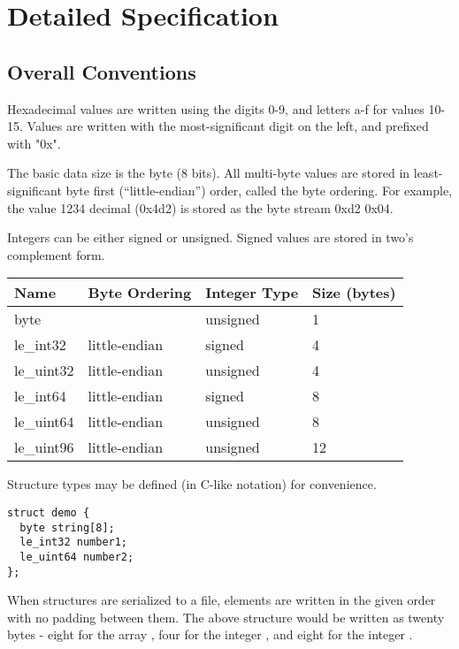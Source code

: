\section{Detailed Specification}
%
\subsection{Overall Conventions}

Hexadecimal values are written using the digits 0-9, and letters a-f
for values 10-15.
%
Values are written with the most-significant digit on the left, and
prefixed with "0x".

The basic data size is the byte (8 bits).
%
All multi-byte values are stored in least-significant byte first
(``little-endian'') order, called the byte ordering.
%
For example, the value 1234 decimal (0x4d2) is stored as the byte
stream 0xd2 0x04.

Integers can be either signed or unsigned.
%
Signed values are stored in two's complement form.

\begin{center}
\begin{tabular}{l l l l}
\hline
\textbf{Name} & \textbf{Byte Ordering} & \textbf{Integer Type} & \textbf{Size (bytes)} \\
\hline
byte & & unsigned & 1 \\
le\_int32 & little-endian & signed & 4 \\
le\_uint32 & little-endian & unsigned & 4 \\
le\_int64 & little-endian & signed & 8 \\
le\_uint64 & little-endian & unsigned & 8 \\
le\_uint96 & little-endian & unsigned & 12 \\
\end{tabular}
\end{center}

Structure types may be defined (in C-like notation) for convenience.

\begin{verbatim}
struct demo {
  byte string[8];
  le_int32 number1;
  le_uint64 number2;
};
\end{verbatim}

When structures are serialized to a file, elements are written in the
given order with no padding between them.
%
The above structure would be written as twenty bytes - eight for the
array , four for the integer , and eight for
the integer .

